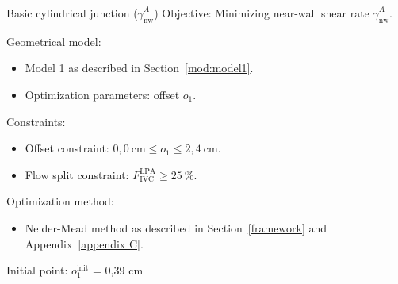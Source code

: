 \begin{optimproblem}{Basic cylindrical junction ($\dot{\gamma}^{A}_{\text{nw}}$)}
	\vspace{2mm}
	Objective:  Minimizing near-wall shear rate $\dot{\gamma}^{A}_{\text{nw}}$.
	
	\vspace{2mm}
	Geometrical model:
	\begin{itemize}
		\item Model 1 as described in Section~\ref{mod:model1}.
		\item Optimization parameters: offset $o_1$.
	\end{itemize}
	Constraints:
	\begin{itemize}
		\item Offset constraint: $0{,}0~\text{cm} \leq o_1 \leq 2{,}4~\text{cm}$.
		\item Flow split constraint: $F^{\text{LPA}}_{\text{IVC}} \geq 25~\%$.
	\end{itemize}
	Optimization method:
	\begin{itemize}
		\item Nelder-Mead method as described in Section~\ref{framework} and Appendix~\ref{appendix C}.
	\end{itemize}
	Initial point: $o^{\text{init}}_{1}$ = 0{,}39 cm
	\label{optimprob:1}
\end{optimproblem}

